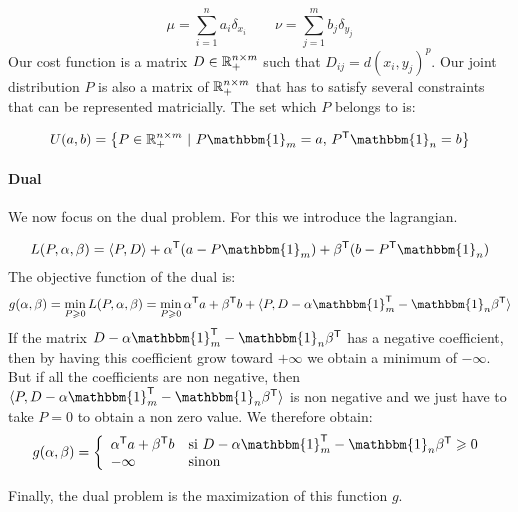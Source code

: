$$ \mu = \sum_{i=1}^n a_i \delta_{x_i} \qquad \nu = \sum_{j =1}^m b_j \delta_{y_j} $$
Our cost function is a matrix $D \in \mathbb{R}_+^{n \times m}$ such that $D_{ij} = d(x_i, y_j)^p$. Our joint distribution $P$ is also a matrix of $\mathbb{R}_+^{n \times m}$ that has to satisfy several constraints that can be represented matricially. The set which $P$ belongs to is:

$$ U(a, b) = \left\{ P \in \R_+^{n \times m}~|~P \mathbbm{1}_m = a, \, P^\trans \mathbbm{1}_n = b \right\} $$


\paragraph{Dual} We now focus on the dual problem. For this we introduce the lagrangian.

$$ L(P, \alpha, \beta) = \langle P, D \rangle + \alpha^\trans (a - P \mathbbm{1}_m) + \beta^\trans (b - P^\trans \mathbbm{1}_n) $$
The objective function of the dual is:
$$ g(\alpha, \beta) = \min_{P \geqslant 0} L(P, \alpha, \beta) = \min_{P \geqslant 0} \alpha^\trans a + \beta^\trans b + \langle P, D - \alpha \mathbbm{1}_m^\trans - \mathbbm{1}_n \beta^\trans \rangle $$
If the matrix $D - \alpha \mathbbm{1}_m^\trans - \mathbbm{1}_n \beta^\trans$ has a negative coefficient, then by having this coefficient grow toward $+\infty$ we obtain a minimum of $-\infty$. But if all the coefficients are non negative, then  $\langle P, D - \alpha
\mathbbm{1}_m^\trans - \mathbbm{1}_n \beta^\trans \rangle$ is non negative and we just have to take $P=0$ to obtain a non zero value. We therefore obtain:
$$ g(\alpha, \beta) = \left\{ \begin{array}{ll}
\alpha^\trans a + \beta^\trans b & \text{si } D - \alpha \mathbbm{1}_m^\trans - \mathbbm{1}_n \beta^\trans \geqslant 0 \\
-\infty & \text{sinon}
\end{array}\right. $$

Finally, the dual problem is the maximization of this function $g$.


